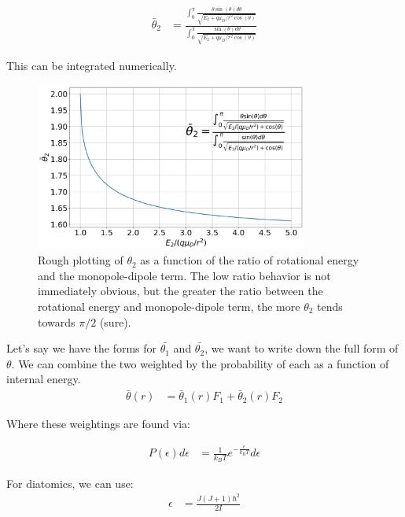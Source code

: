 \documentclass[a4paper]{article}
\begin{document}
\begin{enumerate}
\begin{align}
    \bar{\theta}_2 & = \frac{\int_0^\pi \frac{\theta \sin(\theta) d\theta}{\sqrt{E_2 + q \mu_D/r^2 \cos(\theta)}}}{\int_0^\pi \frac{\sin(\theta) d \theta}{\sqrt{E_2 + q \mu_D/r^2 \cos(\theta)}}}
\end{align}

This can be integrated numerically.
\begin{figure}[H]
\label{fig: theta2}
\centering
\includegraphics[width=0.8\textwidth]{ADO_theta2.png}
\caption{Rough plotting of $\theta_2$ as a function of the ratio of rotational energy and the monopole-dipole term. The low ratio behavior is not immediately obvious, but the greater the ratio between the rotational energy and monopole-dipole term, the more $\theta_2$ tends towards $\pi/2$ (sure).}
\end{figure}

\end{enumerate}

Let's say we have the forms for $\bar{\theta_1}$ and $\bar{\theta_2}$, we want to write down the full form of $\theta$. We can combine the two weighted by the probability of each as a function of internal energy.
\begin{align*}
    \bar{\theta}(r) & = \bar{\theta}_1(r) F_1 + \bar{\theta}_2(r) F_2
\end{align*}

Where these weightings are found via:

\begin{align*}
    P(\epsilon) d\epsilon & = \frac{1}{k_BT}e^{-\frac{\epsilon}{k_BT}}d\epsilon
\end{align*}

For diatomics, we can use:
\begin{align*}
    \epsilon & = \frac{J(J+1)\hbar^2}{2I}
\end{align*}
\end{document}

